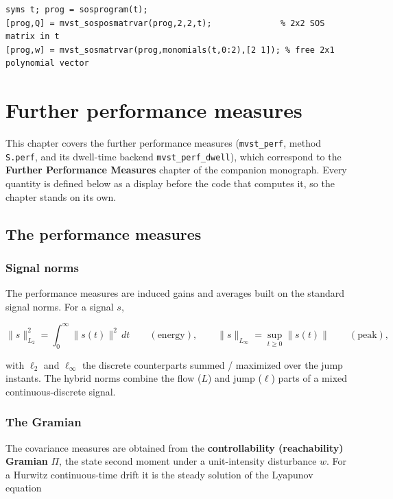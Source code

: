 \documentclass[11pt,oneside]{report}
\newcommand{\code}[1]{\texttt{#1}}
\begin{document}
\begin{lstlisting}[style=matlabstyle]
syms t; prog = sosprogram(t);
[prog,Q] = mvst_sosposmatrvar(prog,2,2,t);              % 2x2 SOS matrix in t
[prog,w] = mvst_sosmatrvar(prog,monomials(t,0:2),[2 1]); % free 2x1 polynomial vector
\end{lstlisting}


\hypertarget{chap:11-performance}{%
\chapter{Further performance measures}\label{chap:11-performance}}

This chapter covers the further performance measures (\code{mvst\_perf}, method
\code{S.perf}, and its dwell-time backend \code{mvst\_perf\_dwell}), which correspond to the
\textbf{Further Performance Measures} chapter of the companion monograph. Every
quantity is defined below as a display before the code that computes it, so the
chapter stands on its own.

\hypertarget{the-performance-measures}{%
\section{The performance measures}\label{the-performance-measures}}

\hypertarget{signal-norms}{%
\subsection{Signal norms}\label{signal-norms}}

The performance measures are induced gains and averages built on the standard
signal norms. For a signal \(s\),

\[
\|s\|_{L_2}^2 = \int_0^\infty \|s(t)\|^2\, dt
\qquad(\text{energy}),
\qquad
\|s\|_{L_\infty} = \sup_{t \ge 0} \|s(t)\|
\qquad(\text{peak}),
\]

with \(\ell_2\) and \(\ell_\infty\) the discrete counterparts summed / maximized over
the jump instants. The hybrid norms combine the flow (\(L\)) and jump (\(\ell\))
parts of a mixed continuous-discrete signal.

\hypertarget{the-gramian}{%
\subsection{The Gramian}\label{the-gramian}}

The covariance measures are obtained from the \textbf{controllability (reachability)
Gramian} \(\Pi\), the state second moment under a unit-intensity disturbance
\(w\). For a Hurwitz continuous-time drift it is the steady solution of the
Lyapunov equation
\end{document}
